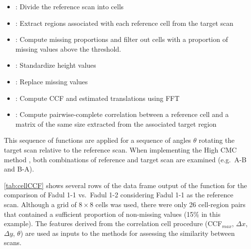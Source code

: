 \begin{itemize}
\tightlist
\item
  : Divide the reference scan into cells
\item
  : Extract regions associated with
  each reference cell from the target scan
\item
  : Compute missing proportions and
  filter out cells with a proportion of missing values above the
  threshold.
\item
  : Standardize height values
\item
  : Replace missing values
\item
  : Compute CCF and estimated translations
  using FFT
\item
  : Compute pairwise-complete correlation between
  a reference cell and a matrix of the same size extracted from the
  associated target region
\end{itemize}

This sequence of functions are applied for a sequence of angles
\(\theta\) rotating the target scan relative to the reference scan. When
implementing the High CMC method \citep{tong_improved_2015}, both
combinations of reference and target scan are examined (e.g.~A-B and
B-A).

\autoref{tab:cellCCF} shows several rows of the data frame output of the
 function for the comparison of Fadul 1-1
vs.~Fadul 1-2 considering Fadul 1-1 as the reference scan. Although a
grid of \(8 \times 8\) cells was used, there were only 26 cell-region
pairs that contained a sufficient proportion of non-missing values (15\%
in this example). The features derived from the correlation cell
procedure (CCF\(_{max}\), \(\Delta x\), \(\Delta y\), \(\theta\)) are
used as inputs to the methods for assessing the similarity between
scans.

